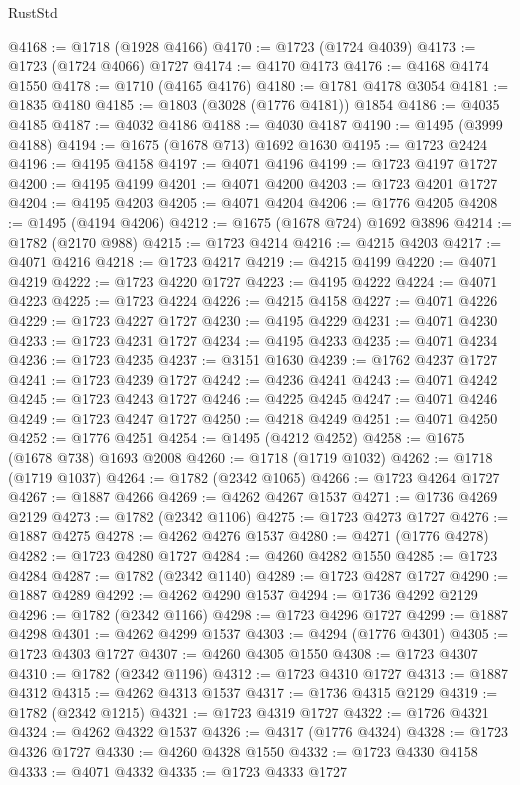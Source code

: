 \begin{lexlean}{RustStd}
\begin{coremodule}
@4168 := @1718 (@1928 @4166)
@4170 := @1723 (@1724 @4039)
@4173 := @1723 (@1724 @4066) @1727
@4174 := @4170 @4173
@4176 := @4168 @4174 @1550
@4178 := @1710 (@4165 @4176)
@4180 := @1781 @4178 @3054
@4181 := @1835 @4180
@4185 := @1803 (@3028 (@1776 @4181)) @1854
@4186 := @4035 @4185
@4187 := @4032 @4186
@4188 := @4030 @4187
@4190 := @1495 (@3999 @4188)
@4194 := @1675 (@1678 @713) @1692 @1630
@4195 := @1723 @2424
@4196 := @4195 @4158
@4197 := @4071 @4196
@4199 := @1723 @4197 @1727
@4200 := @4195 @4199
@4201 := @4071 @4200
@4203 := @1723 @4201 @1727
@4204 := @4195 @4203
@4205 := @4071 @4204
@4206 := @1776 @4205
@4208 := @1495 (@4194 @4206)
@4212 := @1675 (@1678 @724) @1692 @3896
@4214 := @1782 (@2170 @988)
@4215 := @1723 @4214
@4216 := @4215 @4203
@4217 := @4071 @4216
@4218 := @1723 @4217
@4219 := @4215 @4199
@4220 := @4071 @4219
@4222 := @1723 @4220 @1727
@4223 := @4195 @4222
@4224 := @4071 @4223
@4225 := @1723 @4224
@4226 := @4215 @4158
@4227 := @4071 @4226
@4229 := @1723 @4227 @1727
@4230 := @4195 @4229
@4231 := @4071 @4230
@4233 := @1723 @4231 @1727
@4234 := @4195 @4233
@4235 := @4071 @4234
@4236 := @1723 @4235
@4237 := @3151 @1630
@4239 := @1762 @4237 @1727
@4241 := @1723 @4239 @1727
@4242 := @4236 @4241
@4243 := @4071 @4242
@4245 := @1723 @4243 @1727
@4246 := @4225 @4245
@4247 := @4071 @4246
@4249 := @1723 @4247 @1727
@4250 := @4218 @4249
@4251 := @4071 @4250
@4252 := @1776 @4251
@4254 := @1495 (@4212 @4252)
@4258 := @1675 (@1678 @738) @1693 @2008
@4260 := @1718 (@1719 @1032)
@4262 := @1718 (@1719 @1037)
@4264 := @1782 (@2342 @1065)
@4266 := @1723 @4264 @1727
@4267 := @1887 @4266
@4269 := @4262 @4267 @1537
@4271 := @1736 @4269 @2129
@4273 := @1782 (@2342 @1106)
@4275 := @1723 @4273 @1727
@4276 := @1887 @4275
@4278 := @4262 @4276 @1537
@4280 := @4271 (@1776 @4278)
@4282 := @1723 @4280 @1727
@4284 := @4260 @4282 @1550
@4285 := @1723 @4284
@4287 := @1782 (@2342 @1140)
@4289 := @1723 @4287 @1727
@4290 := @1887 @4289
@4292 := @4262 @4290 @1537
@4294 := @1736 @4292 @2129
@4296 := @1782 (@2342 @1166)
@4298 := @1723 @4296 @1727
@4299 := @1887 @4298
@4301 := @4262 @4299 @1537
@4303 := @4294 (@1776 @4301)
@4305 := @1723 @4303 @1727
@4307 := @4260 @4305 @1550
@4308 := @1723 @4307
@4310 := @1782 (@2342 @1196)
@4312 := @1723 @4310 @1727
@4313 := @1887 @4312
@4315 := @4262 @4313 @1537
@4317 := @1736 @4315 @2129
@4319 := @1782 (@2342 @1215)
@4321 := @1723 @4319 @1727
@4322 := @1726 @4321
@4324 := @4262 @4322 @1537
@4326 := @4317 (@1776 @4324)
@4328 := @1723 @4326 @1727
@4330 := @4260 @4328 @1550
@4332 := @1723 @4330 @4158
@4333 := @4071 @4332
@4335 := @1723 @4333 @1727

\end{coremodule}
\end{lexlean}
